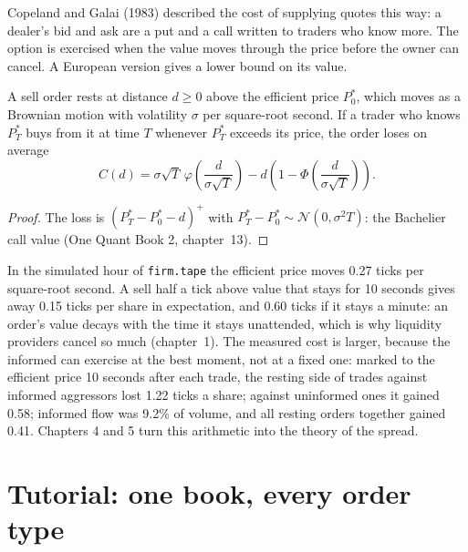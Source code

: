 Copeland and Galai (1983) described the cost of supplying quotes this way: a dealer's bid and ask are a put and a call written to traders who know more.
The option is exercised when the value moves through the price before the owner can cancel. A European version gives a lower bound on its value.

\begin{proposition}\label{prop:mx:order-types-and-their-uses:option}
A sell order rests at distance $d\ge0$ above the efficient price $P^\ast_0$, which moves as a Brownian motion with volatility $\sigma$ per square-root
second. If a trader who knows $P^\ast_T$ buys from it at time $T$ whenever $P^\ast_T$ exceeds its price, the order loses on average
\[
C(d)=\sigma\sqrt T\,\varphi\!\left(\frac{d}{\sigma\sqrt T}\right)-d\left(1-\Phi\!\left(\frac{d}{\sigma\sqrt T}\right)\right).
\]
\end{proposition}

\begin{proof}
The loss is $(P^\ast_T-P^\ast_0-d)^+$ with $P^\ast_T-P^\ast_0\sim\mathcal N(0,\sigma^2T)$: the Bachelier call value (One Quant Book 2, chapter~13).
\end{proof}

\label{lst:mx:order-types-and-their-uses:option}

In the simulated hour of \texttt{firm.tape} the efficient price moves 0.27 ticks per square-root second. A sell half a tick above value that stays for
10 seconds gives away 0.15 ticks per share in expectation, and 0.60 ticks if it stays a minute: an order's value decays with the time it stays
unattended, which is why liquidity providers cancel so much (chapter~1). The measured cost is larger, because the informed can exercise at the best
moment, not at a fixed one: marked to the efficient price 10 seconds after each trade, the resting side of trades against informed aggressors lost 1.22
ticks a share; against uninformed ones it gained 0.58; informed flow was 9.2\% of volume, and all resting orders together gained 0.41. Chapters 4 and 5
turn this arithmetic into the theory of the spread.

\section{Tutorial: one book, every order type}\label{tut:mx:order-types-and-their-uses:tut}

